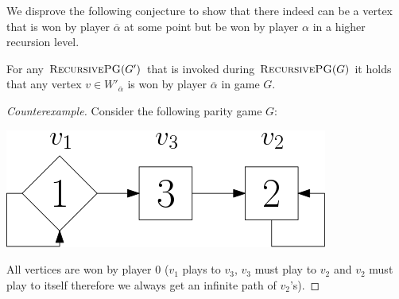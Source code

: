 We disprove the following conjecture to show that there indeed can be a vertex that is won by player $\overline{\alpha}$ at some point but be won by player $\alpha$ in a higher recursion level.
\begin{conjecture}[Disproven]
	For any $\textsc{RecursivePG}(G')$ that is invoked during $\textsc{RecursivePG}(G)$ it holds that any vertex $v \in W'_{\overline{\alpha}}$ is won by player $\overline{\alpha}$ in game $G$.
\begin{proof}[Counterexample]
 Consider the following parity game $G$:\\
	\begin{center}
		\includegraphics[scale=0.4]{counterexampleBconjecture}\\
	\end{center}

	All vertices are won by player $0$ ($v_1$ plays to $v_3$, $v_3$ must play to $v_2$ and $v_2$ must play to itself therefore we always get an infinite path of $v_2$'s).
	

\end{proof}
\end{conjecture}
